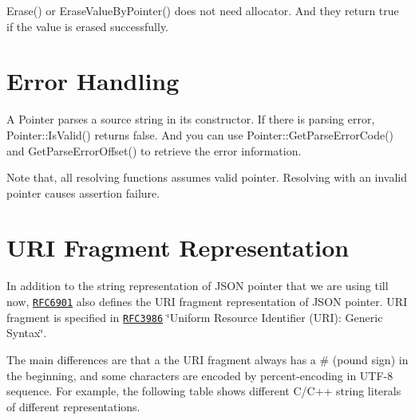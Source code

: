 {\ttfamily Erase()} or {\ttfamily Erase\+Value\+By\+Pointer()} does not need allocator. And they return {\ttfamily true} if the value is erased successfully.\hypertarget{md_Cadriciel_Commun_Externe_RapidJSON_doc_pointer_ErrorHandling}{}\section{Error Handling}\label{md_Cadriciel_Commun_Externe_RapidJSON_doc_pointer_ErrorHandling}
A {\ttfamily Pointer} parses a source string in its constructor. If there is parsing error, {\ttfamily Pointer\+::\+Is\+Valid()} returns false. And you can use {\ttfamily Pointer\+::\+Get\+Parse\+Error\+Code()} and {\ttfamily Get\+Parse\+Error\+Offset()} to retrieve the error information.

Note that, all resolving functions assumes valid pointer. Resolving with an invalid pointer causes assertion failure.\hypertarget{md_Cadriciel_Commun_Externe_RapidJSON_doc_pointer_URIFragment}{}\section{U\+R\+I Fragment Representation}\label{md_Cadriciel_Commun_Externe_RapidJSON_doc_pointer_URIFragment}
In addition to the string representation of J\+S\+ON pointer that we are using till now, \href{https://tools.ietf.org/html/rfc6901}{\tt R\+F\+C6901} also defines the U\+RI fragment representation of J\+S\+ON pointer. U\+RI fragment is specified in \href{https://tools.ietf.org/html/rfc3986}{\tt R\+F\+C3986} \char`\"{}\+Uniform Resource Identifier (\+U\+R\+I)\+: Generic Syntax\char`\"{}.

The main differences are that a the U\+RI fragment always has a {\ttfamily \#} (pound sign) in the beginning, and some characters are encoded by percent-\/encoding in U\+T\+F-\/8 sequence. For example, the following table shows different C/\+C++ string literals of different representations.

